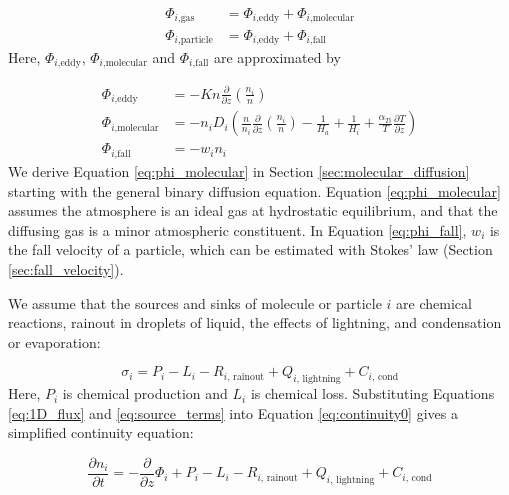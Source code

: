 \begin{align}
  \Phi_{i\text{,gas}} &= \Phi_{i\text{,eddy}} + \Phi_{i\text{,molecular}} \label{eq:phi_gas} \\
  \Phi_{i\text{,particle}} &= \Phi_{i\text{,eddy}} + \Phi_{i\text{,fall}} \label{eq:phi_particle}
\end{align}
Here, $\Phi_{i\text{,eddy}}$, $\Phi_{i\text{,molecular}}$ and $\Phi_{i\text{,fall}}$ are approximated by

\begin{align}
  \Phi_{i\text{,eddy}} &= - Kn\frac{\partial}{\partial z}\left( \frac{n_{i}}{n} \right) \label{eq:phi_eddy}\\ 
  \Phi_{i\text{,molecular}} &= -n_i D_{i} \left( \frac{n}{n_i} \frac{\partial}{\partial z} \left(\frac{n_i}{n}\right) - \frac{1}{H_a} + \frac{1}{H_i} + \frac{\alpha_{Ti}}{T} \frac{\partial T}{\partial z} \right) \label{eq:phi_molecular} \\
  \Phi_{i\text{,fall}} &= - w_i n_i \label{eq:phi_fall}
\end{align}
We derive Equation \eqref{eq:phi_molecular} in Section \ref{sec:molecular_diffusion} starting with the general binary diffusion equation. Equation \eqref{eq:phi_molecular} assumes the atmosphere is an ideal gas at hydrostatic equilibrium, and that the diffusing gas is a minor atmospheric constituent. In Equation \eqref{eq:phi_fall}, $w_i$ is the fall velocity of a particle, which can be estimated with Stokes' law (Section \ref{sec:fall_velocity}).

We assume that the sources and sinks of molecule or particle $i$ are chemical reactions, rainout in droplets of liquid, the effects of lightning, and condensation or evaporation:

\begin{equation} \label{eq:source_terms}
  \sigma_i = P_{i} - L_{i} - R_{i\text{, rainout}} + Q_{i\text{, lightning}} + C_{i\text{, cond}}
\end{equation}
Here, $P_{i}$ is chemical production and $L_i$ is chemical loss. Substituting Equations \eqref{eq:1D_flux} and \eqref{eq:source_terms} into Equation \eqref{eq:continuity0} gives a simplified continuity equation:

\begin{equation} \label{eq:appendix_continuity}
\frac{\partial n_{i}}{\partial t} = - \frac{\partial}{\partial z}\Phi_{i} + P_{i} - L_{i} - R_{i\text{, rainout}} + Q_{i\text{, lightning}} + C_{i\text{, cond}}
\end{equation}

